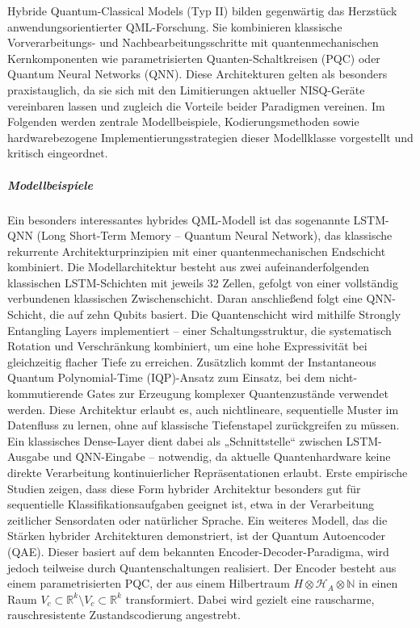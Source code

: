 \noindent
Hybride Quantum-Classical Models (Typ II) bilden gegenwärtig das Herzstück anwendungsorientierter QML-Forschung. Sie kombinieren klassische Vorverarbeitungs- und Nachbearbeitungsschritte mit quantenmechanischen Kernkomponenten wie parametrisierten Quanten-Schaltkreisen (PQC) oder Quantum Neural Networks (QNN). Diese Architekturen gelten als besonders praxistauglich, da sie sich mit den Limitierungen aktueller NISQ-Geräte vereinbaren lassen und zugleich die Vorteile beider Paradigmen vereinen.
Im Folgenden werden zentrale Modellbeispiele, Kodierungsmethoden sowie hardwarebezogene Implementierungsstrategien dieser Modellklasse vorgestellt und kritisch eingeordnet.


\subparagraph{Modellbeispiele}
Ein besonders interessantes hybrides QML-Modell ist das sogenannte LSTM-QNN (Long Short-Term Memory – Quantum Neural Network), das klassische rekurrente Architekturprinzipien mit einer quantenmechanischen Endschicht kombiniert. Die Modellarchitektur besteht aus zwei aufeinanderfolgenden klassischen LSTM-Schichten mit jeweils 32 Zellen, gefolgt von einer vollständig verbundenen klassischen Zwischenschicht. Daran anschließend folgt eine QNN-Schicht, die auf zehn Qubits basiert.
Die Quantenschicht wird mithilfe Strongly Entangling Layers implementiert – einer Schaltungsstruktur, die systematisch Rotation und Verschränkung kombiniert, um eine hohe Expressivität bei gleichzeitig flacher Tiefe zu erreichen. Zusätzlich kommt der Instantaneous Quantum Polynomial-Time (IQP)-Ansatz zum Einsatz, bei dem nicht-kommutierende Gates zur Erzeugung komplexer Quantenzustände verwendet werden. Diese Architektur erlaubt es, auch nichtlineare, sequentielle Muster im Datenfluss zu lernen, ohne auf klassische Tiefenstapel zurückgreifen zu müssen.
Ein klassisches Dense-Layer dient dabei als „Schnittstelle“ zwischen LSTM-Ausgabe und QNN-Eingabe – notwendig, da aktuelle Quantenhardware keine direkte Verarbeitung kontinuierlicher Repräsentationen erlaubt. Erste empirische Studien zeigen, dass diese Form hybrider Architektur besonders gut für sequentielle Klassifikationsaufgaben geeignet ist, etwa in der Verarbeitung zeitlicher Sensordaten oder natürlicher Sprache.
Ein weiteres Modell, das die Stärken hybrider Architekturen demonstriert, ist der Quantum Autoencoder (QAE). Dieser basiert auf dem bekannten Encoder-Decoder-Paradigma, wird jedoch teilweise durch Quantenschaltungen realisiert. Der Encoder besteht aus einem parametrisierten PQC, der aus einem Hilbertraum $H \otimes \mathcal{H}_A \otimes \mathbb{N}$ in einen Raum $V_c \subset \mathbb{R}^k \setminus V_c \subset \mathbb{R}^k$ transformiert. Dabei wird gezielt eine rauscharme, rauschresistente Zustandscodierung angestrebt.
